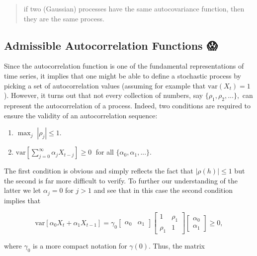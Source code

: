 \documentclass[]{book}
\providecommand{\tightlist}{%
  \setlength{\itemsep}{0pt}\setlength{\parskip}{0pt}}
\theoremstyle{definition}
\theoremstyle{definition}
\theoremstyle{definition}
\theoremstyle{remark}
\begin{document}
\begin{quote}
if two (Gaussian) processes have the same autocovariance function, then
they are the same process.
\end{quote}

\hypertarget{admissible-autocorrelation-functions}{%
\subsection{Admissible Autocorrelation Functions
😱}\label{admissible-autocorrelation-functions}}

Since the autocorrelation function is one of the fundamental
representations of time series, it implies that one might be able to
define a stochastic process by picking a set of autocorrelation values
(assuming for example that \(\text{var}(X_t) = 1\)). However, it turns
out that not every collection of numbers, say
\(\{\rho_1, \rho_2, ...\},\) can represent the autocorrelation of a
process. Indeed, two conditions are required to ensure the validity of
an autocorrelation sequence:

\begin{enumerate}
\def\labelenumi{\arabic{enumi}.}
\tightlist
\item
  \(\operatorname{max}_j \; \left| \rho_j \right| \leq 1\).
\item
  \(\text{var} \left[\sum_{j = 0}^\infty \alpha_j X_{t-j} \right] \geq 0 \;\)
  for all \(\{\alpha_0, \alpha_1, ...\}\).
\end{enumerate}

The first condition is obvious and simply reflects the fact that
\(|\rho \left( h \right)| \leq 1\) but the second is far more difficult
to verify. To further our understanding of the latter we let
\(\alpha_j = 0\) for \(j > 1\) and see that in this case the second
condition implies that

\[\text{var} \left[ \alpha_0 X_{t} + \alpha_1 X_{t-1}  \right] = \gamma_0 \begin{bmatrix}
   \alpha_0 & \alpha_1
   \end{bmatrix}   \begin{bmatrix}
   1 & \rho_1\\
   \rho_1 & 1
   \end{bmatrix} \begin{bmatrix}
   \alpha_0 \\
   \alpha_1
   \end{bmatrix} \geq 0, \]

where \(\gamma_0\) is a more compact notation for \(\gamma(0)\). Thus,
the matrix
\end{document}
